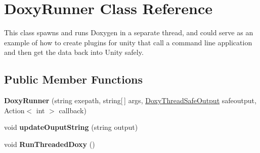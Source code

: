 \hypertarget{class_doxy_runner}{}\section{Doxy\+Runner Class Reference}
\label{class_doxy_runner}


This class spawns and runs Doxygen in a separate thread, and could serve as an example of how to create plugins for unity that call a command line application and then get the data back into Unity safely.  


\subsection*{Public Member Functions}
\begin{DoxyCompactItemize}
\item 
{\bfseries Doxy\+Runner} (string exepath, string\mbox{[}$\,$\mbox{]} args, \hyperlink{class_doxy_thread_safe_output}{Doxy\+Thread\+Safe\+Output} safeoutput, Action$<$ int $>$ callback)\hypertarget{class_doxy_runner_aed7742f6732027e7427393d727898eba}{}\label{class_doxy_runner_aed7742f6732027e7427393d727898eba}

\item 
void {\bfseries update\+Ouput\+String} (string output)\hypertarget{class_doxy_runner_a4474ed980f895f97ac3517fe85834259}{}\label{class_doxy_runner_a4474ed980f895f97ac3517fe85834259}

\item 
void {\bfseries Run\+Threaded\+Doxy} ()\hypertarget{class_doxy_runner_a0a838402bf7b6661d4a1959c1b57aeb6}{}\label{class_doxy_runner_a0a838402bf7b6661d4a1959c1b57aeb6}

\end{DoxyCompactItemize}
